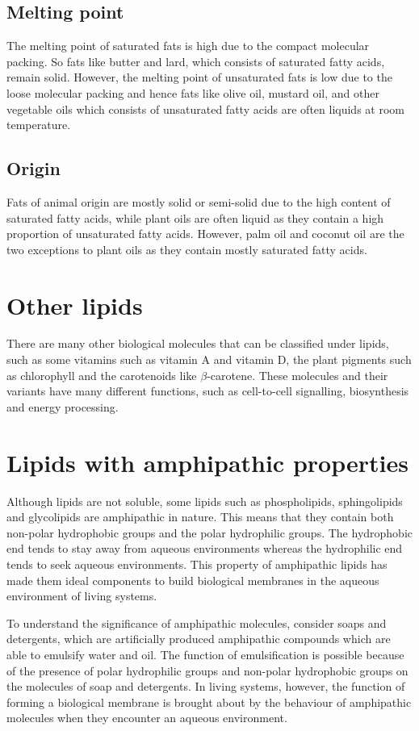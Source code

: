\documentclass[11pt]{article}
\begin{document}
\subsection{Melting point}
\label{sec:org3793d1d}
The melting point of saturated fats is high due to the compact molecular packing. So fats like butter and lard, which consists of saturated fatty acids, remain solid. However, the melting point of unsaturated fats is low due to the loose molecular packing and hence fats like olive oil, mustard oil, and other vegetable oils which consists of unsaturated fatty acids are often liquids at room temperature.
\subsection{Origin}
\label{sec:orgb7addc5}
Fats of animal origin are mostly solid or semi-solid due to the high content of saturated fatty acids, while plant oils are often liquid as they contain a high proportion of unsaturated fatty acids. However, palm oil and coconut oil are the two exceptions to plant oils as they contain mostly saturated fatty acids.
\section{Other lipids}
\label{sec:org4c18aef}
There are many other biological molecules that can be classified under lipids, such as some vitamins such as vitamin A and vitamin D, the plant pigments such as chlorophyll and the carotenoids like \(\beta\)-carotene. These molecules and their variants have many different functions, such as cell-to-cell signalling, biosynthesis and energy processing.

\newpage
\section{Lipids with amphipathic properties}
\label{sec:org5a043f7}
Although lipids are not soluble, some lipids such as phospholipids, sphingolipids and glycolipids are amphipathic in nature. This means that they contain both non-polar hydrophobic groups and the polar hydrophilic groups. The hydrophobic end tends to stay away from aqueous environments whereas the hydrophilic end tends to seek aqueous environments. This property of amphipathic lipids has made them ideal components to build biological membranes in the aqueous environment of living systems.


To understand the significance of amphipathic molecules, consider soaps and detergents, which are artificially produced amphipathic compounds which are able to emulsify water and oil. The function of emulsification is possible because of the presence of polar hydrophilic groups and non-polar hydrophobic groups on the molecules of soap and detergents. In living systems, however, the function of forming a biological membrane is brought about by the behaviour of amphipathic molecules when they encounter an aqueous environment.
\end{document}
